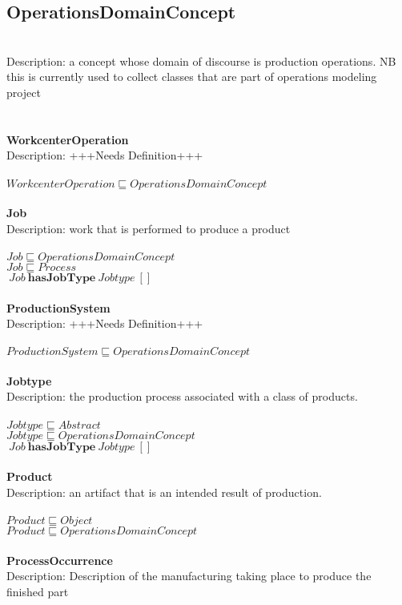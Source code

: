 \subsection{OperationsDomainConcept}\\
Description: a concept whose domain of discourse is production operations. NB this is currently used to collect classes that are part of operations modeling project\\
\\\\   \textbf{WorkcenterOperation}\\Description: +++Needs Definition+++\\
\\$ WorkcenterOperation \sqsubseteq OperationsDomainConcept$
\\\\   \textbf{Job}\\Description: work that is performed to produce a product\\
\\$ Job \sqsubseteq OperationsDomainConcept$
\\$ Job \sqsubseteq Process$
\\$\: Job\: \textbf{hasJobType}\: Jobtype\: []$
\\\\   \textbf{ProductionSystem}\\Description: +++Needs Definition+++\\
\\$ ProductionSystem \sqsubseteq OperationsDomainConcept$
\\\\   \textbf{Jobtype}\\Description: the production process associated with a class of products.\\
\\$ Jobtype \sqsubseteq Abstract$
\\$ Jobtype \sqsubseteq OperationsDomainConcept$
\\$\: Job\: \textbf{hasJobType}\: Jobtype\:  []$
\\\\   \textbf{Product}\\Description: an artifact that is an intended result of production.\\
\\$ Product \sqsubseteq Object$
\\$ Product \sqsubseteq OperationsDomainConcept$
\\\\   \textbf{ProcessOccurrence}\\Description: Description of the manufacturing taking place to produce the finished part\\
